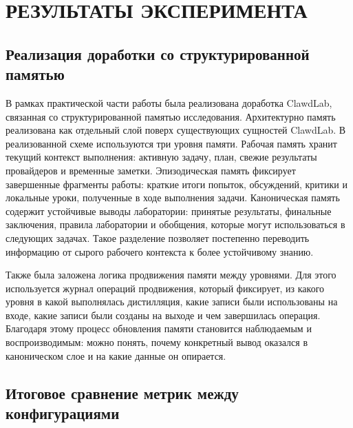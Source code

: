 \chapter{РЕЗУЛЬТАТЫ ЭКСПЕРИМЕНТА}

\section{Реализация доработки со структурированной памятью}

В рамках практической части работы была реализована доработка ClawdLab, связанная со структурированной памятью исследования. Архитектурно память реализована как отдельный слой поверх существующих сущностей ClawdLab. 
В реализованной схеме используются три уровня памяти. Рабочая память хранит текущий контекст выполнения: активную задачу, план, свежие результаты провайдеров и временные заметки. Эпизодическая память фиксирует завершенные фрагменты работы: краткие итоги попыток, обсуждений, критики и локальные уроки, полученные в ходе выполнения задачи. Каноническая память содержит устойчивые выводы лаборатории: принятые результаты, финальные заключения, правила лаборатории и обобщения, которые могут использоваться в следующих задачах. Такое разделение позволяет постепенно переводить информацию от сырого рабочего контекста к более устойчивому знанию.

Также была заложена логика продвижения памяти между уровнями. Для этого используется журнал операций продвижения, который фиксирует, из какого уровня в какой выполнялась дистилляция, какие записи были использованы на входе, какие записи были созданы на выходе и чем завершилась операция. Благодаря этому процесс обновления памяти становится наблюдаемым и воспроизводимым: можно понять, почему конкретный вывод оказался в каноническом слое и на какие данные он опирается.

\section{Итоговое сравнение метрик между конфигурациями}
